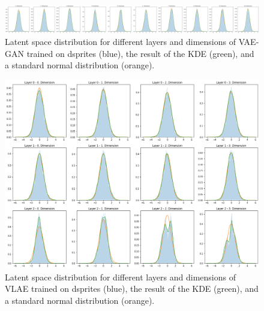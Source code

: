 \documentclass[11pt,a4paper]{article}
\begin{document}
\begin{figure}[H]
\centering
\includegraphics[width=\textwidth]{images/generated_vs_true/dsprites/vae_gan_kde.png}
\caption[\ac{VAE}-\ac{GAN} on dsprites: Estimated Latent Space Distribution]{Latent space distribution for different layers and dimensions of \ac{VAE}-\ac{GAN} trained on dsprites (blue), the result of the \ac{KDE} (green), and a standard normal distribution (orange).}
\end{figure}


\begin{figure}[H]
\centering
\includegraphics[width=\textwidth]{images/generated_vs_true/dsprites/vlae_kde.png}
\caption[\ac{VLAE} on dsprites: Estimated Latent Space Distribution]{Latent space distribution for different layers and dimensions of \ac{VLAE} trained on dsprites (blue), the result of the \ac{KDE} (green), and a standard normal distribution (orange).}
\end{figure}
\end{document}
